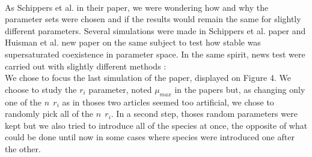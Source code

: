 \\
As Schippers et al. in their paper\supercite{2008:Schippers}, we were wondering how and why the parameter sets were chosen and if the results would remain the same for slightly different parameters. Several simulations were made in Schippers et al. paper\supercite{2008:Schippers} and Huisman et al. new paper on the same subject\supercite{2008:Huisman} to test how stable was supersaturated coexistence in parameter space. In the same spirit, news test were carried out with slightly different methods :\\We chose to focus the last simulation of the paper\supercite{1999:Huisman}, displayed on Figure 4. We choose to study the $r_i$ parameter, noted $\mu_{max}$ in the papers\supercite{2008:Schippers,2008:Huisman} but, as changing only one of the $n~~r_i$ as in thoses two articles seemed too artificial, we chose to randomly pick all of the $n~~r_i$. In a second step, thoses random parameters were kept but we also tried to introduce all of the species at once, the opposite of what could be done until now in some cases where species were introduced one after the other. 
